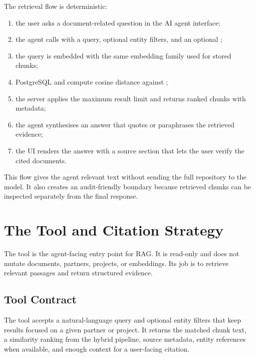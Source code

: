 The retrieval flow is deterministic:

\begin{enumerate}
  \item the user asks a document-related question in the AI agent interface;
  \item the agent calls  with a query, optional entity filters, and an optional ;
  \item the query is embedded with the same embedding family used for stored chunks;
  \item PostgreSQL and  compute cosine distance against ;
  \item the server applies the maximum result limit and returns ranked chunks with metadata;
  \item the agent synthesises an answer that quotes or paraphrases the retrieved evidence;
  \item the UI renders the answer with a source section that lets the user verify the cited documents.
\end{enumerate}

This flow gives the agent relevant text without sending the full repository to the model. It also creates an audit-friendly boundary because retrieved chunks can be inspected separately from the final response.

\section{The  Tool and Citation Strategy}
\label{sec:chapter7-search-documents}

The  tool is the agent-facing entry point for RAG. It is read-only and does not mutate documents, partners, projects, or embeddings. Its job is to retrieve relevant passages and return structured evidence.

\subsection{Tool Contract}
\label{subsec:chapter7-tool-contract}

The tool accepts a natural-language query and optional entity filters that keep results focused on a given partner or project. It returns the matched chunk text, a similarity ranking from the hybrid pipeline, source metadata, entity references when available, and enough context for a user-facing citation.

